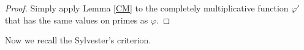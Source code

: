 \documentclass[a4paper,12pt, reqn0]{amsart}
\theoremstyle{remark}
\newcommand{\Mcal}{\mathcal{M}}
\begin{document}
\begin{proof}
  Simply apply Lemma \ref{CM} to the completely multiplicative function $\varphi'$ that
  has the same values on primes as $\varphi$. 
\end{proof}


Now we recall the Sylvester's criterion.
\end{document}
